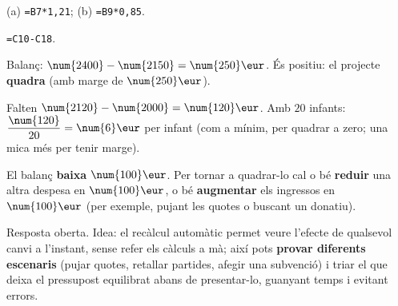 \begin{solucions}
\begin{sollist}
  \item (a) \texttt{=B7*1,21}; \quad (b) \texttt{=B9*0,85}.
  \item \texttt{=C10-C18}.
  \item Balanç: $\num{2400}-\num{2150}=\num{250}\eur$. És positiu: el projecte
        \textbf{quadra} (amb marge de $\num{250}\eur$).
  \item Falten $\num{2120}-\num{2000}=\num{120}\eur$. Amb $20$ infants:
        $\dfrac{\num{120}}{20}=\num{6}\eur$ per infant (com a mínim, per quadrar a zero;
        una mica més per tenir marge).
  \item El balanç \textbf{baixa $\num{100}\eur$}. Per tornar a quadrar-lo cal o bé
        \textbf{reduir} una altra despesa en $\num{100}\eur$, o bé \textbf{augmentar}
        els ingressos en $\num{100}\eur$ (per exemple, pujant les quotes o buscant un
        donatiu).
  \item Resposta oberta. Idea: el recàlcul automàtic permet veure l'efecte de qualsevol
        canvi a l'instant, sense refer els càlculs a mà; així pots \textbf{provar
        diferents escenaris} (pujar quotes, retallar partides, afegir una subvenció) i
        triar el que deixa el pressupost equilibrat abans de presentar-lo, guanyant
        temps i evitant errors.
\end{sollist}
\end{solucions}
